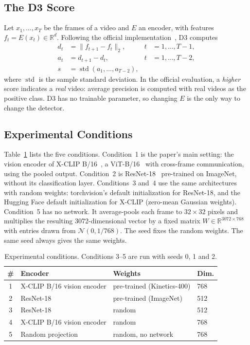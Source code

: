 \documentclass[conference]{IEEEtran}
\begin{document}
\subsection{The D3 Score}

Let $x_1,\dots,x_T$ be the frames of a video and $E$ an encoder, with
features $f_t = E(x_t) \in \mathbb{R}^d$. Following the official
implementation~\cite{d3code}, D3 computes
\begin{align}
  d_t &= \lVert f_{t+1} - f_t \rVert_2, & t &= 1,\dots,T-1,\\
  a_t &= d_{t+1} - d_t,                 & t &= 1,\dots,T-2,\\
  s   &= \operatorname{std}(a_1,\dots,a_{T-2}), &&
\end{align}
where $\operatorname{std}$ is the sample standard deviation. In the official
evaluation, a \emph{higher} score indicates a \emph{real} video: average
precision is computed with real videos as the positive class. D3 has no
trainable parameter, so changing $E$ is the only way to change the detector.

\subsection{Experimental Conditions}

Table~\ref{tab:conditions} lists the five conditions. Condition~1 is the
paper's main setting: the vision encoder of X-CLIP B/16~\cite{ni2022xclip}, a
ViT-B/16~\cite{dosovitskiy2021vit} with cross-frame communication, using the
pooled output. Condition~2 is ResNet-18~\cite{he2016resnet} pre-trained on
ImageNet, without its classification layer. Conditions~3 and~4 use the same
architectures with random weights: torchvision's default initialization for
ResNet-18, and the Hugging Face default initialization for X-CLIP (zero-mean
Gaussian weights). Condition~5 has no network. It average-pools each frame to
$32\times32$ pixels and multiplies the resulting 3072-dimensional vector by a
fixed matrix $W \in \mathbb{R}^{3072\times768}$ with entries drawn from
$\mathcal{N}(0, 1/768)$. The seed fixes the random weights. The same seed
always gives the same weights.

\begin{table}[t]
\caption{Experimental conditions. Conditions 3--5 are run with seeds 0, 1
and 2.}
\label{tab:conditions}
\centering
\footnotesize
\setlength{\tabcolsep}{4pt}
\begin{tabular}{@{}clll@{}}
\toprule
\# & Encoder & Weights & Dim. \\
\midrule
1 & X-CLIP B/16 vision encoder & pre-trained (Kinetics-400) & 768 \\
2 & ResNet-18                  & pre-trained (ImageNet)     & 512 \\
3 & ResNet-18                  & random                     & 512 \\
4 & X-CLIP B/16 vision encoder & random                     & 768 \\
5 & Random projection          & random, no network         & 768 \\
\bottomrule
\end{tabular}
\end{table}
\end{document}
